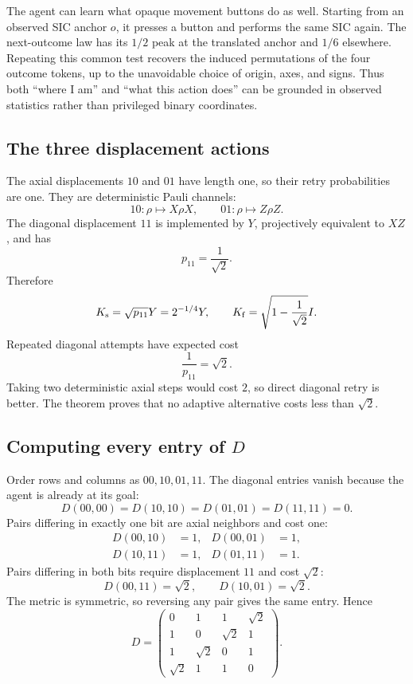 \documentclass[11pt]{article}
\theoremstyle{definition}
\theoremstyle{remark}
\begin{document}
The agent can learn what opaque movement buttons do as well. Starting from an
observed SIC anchor \(o\), it presses a button and performs the same SIC again.
The next-outcome law has its \(1/2\) peak at the translated anchor and \(1/6\)
elsewhere. Repeating this common test recovers the induced permutations of the
four outcome tokens, up to the unavoidable choice of origin, axes, and signs.
Thus both ``where I am'' and ``what this action does'' can be grounded in
observed statistics rather than privileged binary coordinates.

\subsection{The three displacement actions}

The axial displacements \(10\) and \(01\) have length one, so their retry
probabilities are one.  They are deterministic Pauli channels:
\[
  10:\rho\mapsto X\rho X,
  \qquad
  01:\rho\mapsto Z\rho Z.
\]
The diagonal displacement \(11\) is implemented by \(Y\), projectively
equivalent to \(XZ\), and has
\[
 p_{11}=\frac1{\sqrt2}.
\]
Therefore
\begin{equation}
 K_{\rm s}=\sqrt{p_{11}}Y=2^{-1/4}Y,
 \qquad
 K_{\rm f}=\sqrt{1-\frac1{\sqrt2}}I.
 \label{eq:diagonal-kraus}
\end{equation}
Repeated diagonal attempts have expected cost
\[
  \frac1{p_{11}}=\sqrt2.
\]
Taking two deterministic axial steps would cost \(2\), so direct diagonal
retry is better. The theorem proves that no adaptive alternative costs less
than \(\sqrt2\).

\subsection{Computing every entry of \(D\)}

Order rows and columns as \(00,10,01,11\). The diagonal entries vanish because
the agent is already at its goal:
\[
 D(00,00)=D(10,10)=D(01,01)=D(11,11)=0.
\]
Pairs differing in exactly one bit are axial neighbors and cost one:
\begin{align*}
 D(00,10)&=1,&D(00,01)&=1,\\
 D(10,11)&=1,&D(01,11)&=1.
\end{align*}
Pairs differing in both bits require displacement \(11\) and cost
\(\sqrt2\):
\[
 D(00,11)=\sqrt2,
 \qquad
 D(10,01)=\sqrt2.
\]
The metric is symmetric, so reversing any pair gives the same entry.  Hence
\begin{equation}
\boxed{
 D=\begin{pmatrix}
 0&1&1&\sqrt2\\
 1&0&\sqrt2&1\\
 1&\sqrt2&0&1\\
 \sqrt2&1&1&0
 \end{pmatrix}.}
 \label{eq:D}
\end{equation}
\end{document}
